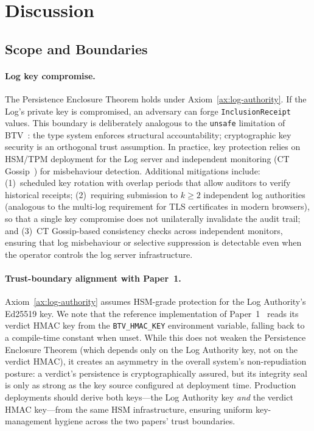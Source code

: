 \section{Discussion}
\label{sec:discussion}

\subsection{Scope and Boundaries}

\paragraph{Log key compromise.}
The Persistence Enclosure Theorem holds under Axiom~\ref{ax:log-authority}.
If the Log's private key is compromised, an adversary can forge
\texttt{InclusionReceipt} values. This boundary is deliberately analogous to
the \texttt{unsafe} limitation of BTV~\cite{btv2026}: the type system enforces
structural accountability; cryptographic key security is an orthogonal trust
assumption. In practice, key protection relies on HSM/TPM deployment for the
Log server and independent monitoring (CT Gossip~\cite{rfc6962}) for
misbehaviour detection. Additional mitigations include: (1)~scheduled key
rotation with overlap periods that allow auditors to verify historical receipts;
(2)~requiring submission to $k \geq 2$ independent log authorities (analogous
to the multi-log requirement for TLS certificates in modern browsers), so that
a single key compromise does not unilaterally invalidate the audit trail; and
(3)~CT Gossip-based consistency checks across independent monitors, ensuring
that log misbehaviour or selective suppression is detectable even when the
operator controls the log server infrastructure.

\paragraph{Trust-boundary alignment with Paper~1.}
Axiom~\ref{ax:log-authority} assumes HSM-grade protection for the
Log Authority's Ed25519 key. We note that the reference
implementation of Paper~1~\cite{btv2026} reads its verdict HMAC key
from the \texttt{BTV\_HMAC\_KEY} environment variable, falling back
to a compile-time constant when unset. While this does not weaken the
Persistence Enclosure Theorem (which depends only on the Log Authority
key, not on the verdict HMAC), it creates an asymmetry in the overall
system's non-repudiation posture: a verdict's persistence is
cryptographically assured, but its integrity seal is only as strong as
the key source configured at deployment time. Production deployments
should derive both keys---the Log Authority key \emph{and} the verdict
HMAC key---from the same HSM infrastructure, ensuring uniform
key-management hygiene across the two papers' trust boundaries.

